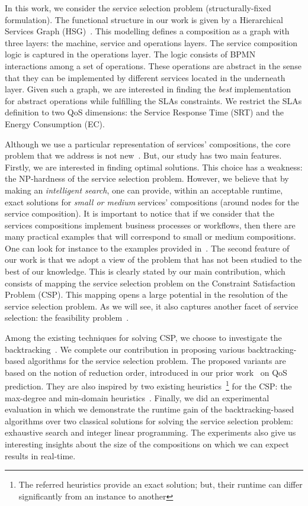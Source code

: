 \documentclass[a4paper]{article}
\begin{document}
In this work, we consider the service selection problem (structurally-fixed formulation). The functional 
structure in our work is given by a Hierarchical Services Graph (HSG)~\cite{GoldmanNgoko}. This modelling defines 
a  composition as a graph with three layers: the machine, service and operations layers. The service composition 
logic is captured in the operations layer. The logic consists of BPMN~\cite{Weske2007} interactions 
among a set of operations. These operations are abstract in the sense that they can be 
implemented by different services located in the underneath layer. Given such a graph, 
we are interested  in finding the {\it best} implementation for abstract operations while fulfilling the SLAs constraints. 
We restrict the SLAs definition to two QoS dimensions:  the Service Response Time (SRT) and the Energy Consumption (EC). 

Although we use a particular representation of services' compositions, the core problem that we address is not 
new~\cite{Alrifai,BenMokhtar,Zheng,Ardagna,JISA}. But, our study has two main features. Firstly, we are interested in 
finding optimal solutions. This choice has a weakness: the NP-hardness of the service selection problem. However, 
we believe that by making an  {\it intelligent search}, one can provide, within an acceptable runtime,  
exact solutions for {\it small or medium} services' compositions (around  nodes for the service composition). 
It is important to notice that if we consider that the services compositions implement business processes or workflows, 
then there are many practical examples that will correspond to small or medium compositions. One can look 
for instance to the examples provided in~\cite{Omg,Freund}. 
The second feature of our work is that we adopt a view 
of the problem that has not been studied to the best of our knowledge. This is clearly stated by our 
main contribution, which consists of mapping the service selection problem on the Constraint Satisfaction 
Problem (CSP). This mapping opens a 
large potential in the resolution of the service selection problem. As we will see, 
it also captures another facet of service selection: the feasibility problem~\cite{Ardagna,JISA}. 

Among the existing
techniques for solving CSP, we choose to investigate the 
backtracking~\cite{Baker95intelligentbacktracking}. We complete our contribution in proposing various 
backtracking-based algorithms for the service selection problem. The proposed variants are based on the notion of 
reduction order, introduced in our prior work~\cite{GoldmanNgoko} on QoS prediction. They are also inspired by two 
existing heuristics~\footnote{The referred heuristics provide an exact solution; but, their runtime can differ significantly 
from an instance to another} for the CSP:  the max-degree and min-domain heuristics~\cite{Baker95intelligentbacktracking}. 
Finally, we did an experimental evaluation in which we demonstrate the runtime gain of the backtracking-based 
algorithms over two classical solutions for solving the service selection 
problem: exhaustive search and integer linear programming. The experiments also give us interesting insights about 
the size of the compositions on which we can expect results in real-time. 
\end{document}
